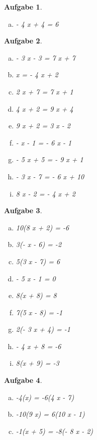 \documentclass[12pt]{article}
\theoremstyle{note}
\newtheorem{aufgabe}{Aufgabe}
\begin{document}
\begin{flushleft}
\begin{aufgabe}
\begin{multicols}{3}
\begin{enumerate}[a)]
\item 
- 4 x + 4 = 6
\end{enumerate} 
\end{multicols} 
\end{aufgabe} 
\begin{aufgabe} ~ \\ 
\begin{multicols}{3} 
\begin{enumerate}[a)] 
\item 
- 3 x - 3 = 7 x + 7
\item 
x = - 4 x + 2
\item 
2 x + 7 = 7 x + 1
\item 
4 x + 2 = 9 x + 4
\item 
9 x + 2 = 3 x - 2
\item 
- x - 1 = - 6 x - 1
\item 
- 5 x + 5 = - 9 x + 1
\item 
- 3 x - 7 = - 6 x + 10
\item 
8 x - 2 = - 4 x + 2
\end{enumerate} 
\end{multicols} 
\end{aufgabe} 
\begin{aufgabe} ~ \\ 
\begin{multicols}{3} 
\begin{enumerate}[a)] 
\item 
10(8 x + 2) = -6
\item 
3(- x - 6) = -2
\item 
5(3 x - 7) = 6
\item 
- 5 x - 1 = 0
\item 
8(x + 8) = 8
\item 
7(5 x - 8) = -1
\item 
2(- 3 x + 4) = -1
\item 
- 4 x + 8 = -6
\item 
8(x + 9) = -3
\end{enumerate} 
\end{multicols} 
\end{aufgabe} 
\begin{aufgabe} ~ \\ 
\begin{multicols}{2} 
\begin{enumerate}[a)] 
\item 
-4(x) = -6(4 x - 7)
\item 
-10(9 x) = 6(10 x - 1)
\item 
-1(x + 5) = -8(- 8 x - 2)

\end{enumerate}
\end{multicols}
\end{aufgabe}
\end{flushleft}
\end{document}
